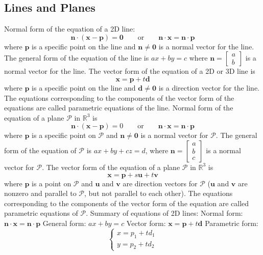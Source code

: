\documentclass{article}
\begin{document}
    \subsection{Lines and Planes}
    \begin{outline}
        \1 Normal form of the equation of a 2D line: \[\mathbf{n\cdot(x-p)=0}\qquad\text{or}\qquad\mathbf{n\cdot x=n\cdot p}\] where \(\mathbf p\) is a specific point on the line and \(\mathbf{n\neq 0}\) is a normal vector for the line. 
        \1 The general form of the equation of the line is \(ax+by=c\) where \(\mathbf n=\begin{bmatrix}a\\b\end{bmatrix}\) is a normal vector for the line. 
        \1 The vector form of the equation of a 2D or 3D line is \[\mathbf{x=p}+t\mathbf{d}\] where \(\mathbf p\) is a specific point on the line and \(\mathbf{d\neq 0}\) is a direction vector for the line. The equations corresponding to the components of the vector form of the equations are called parametric equations of the line. 
        \1 Normal form of the equation of a plane \(\mathscr{P}\) in \(\mathbb R^3\) is \[\mathbf{n\cdot(x-p)}=0\qquad\text{or}\qquad\mathbf{n\cdot x=n\cdot p}\] where \(\mathbf p\) is a specific point on \(\mathscr P\) and \(\mathbf{n\neq 0}\) is a normal vector for \(\mathscr P\). 
        \1 The general form of the equation of \(\mathscr P\) is \(ax+by+cz=d\), where \(\mathbf n=\begin{bmatrix}a\\b\\c\end{bmatrix}\) is a normal vector for \(\mathscr P\). 
        \1 The vector form of the equation of a plane \(\mathscr P\) in \(\mathbb R^3\) is \[\mathbf{x=p}+s\mathbf u+t\mathbf v\] where \(\mathbf p\) is a point on \(\mathscr P\) and \(\mathbf u\) and \(\mathbf v\) are direction vectors for \(\mathscr P\) (\(\mathbf u\) and \(\mathbf v\) are nonzero and parallel to \(\mathscr P\), but not parallel to each other). The equations corresponding to the components of the vector form of the equation are called parametric equations of \(\mathscr P\). 
        \1 Summary of equations of 2D lines:
            \2 Normal form: \(\mathbf{n\cdot x=n\cdot p}\)
            \2 General form: \(ax+by=c\)
            \2 Vector form: \(\mathbf{x=p}+t\mathbf{d}\)
            \2 Parametric form: \[\begin{cases}x=p_1+td_1\\y=p_2+td_2\end{cases}\]

\end{outline}
\end{document}
